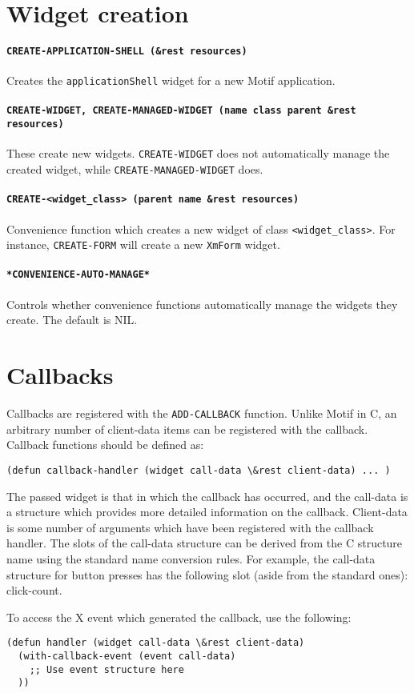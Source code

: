 \documentclass[a4paper]{article}
\newcommand{\functdescr}[1]{\paragraph{\texttt{#1}}}
\begin{document}
\section{Widget creation}


\functdescr{CREATE-APPLICATION-SHELL (\&rest resources)} Creates the
\texttt{applicationShell} widget for a new Motif application.

\functdescr{CREATE-WIDGET, CREATE-MANAGED-WIDGET (name class parent
\&rest resources)} These create new widgets.  \texttt{CREATE-WIDGET}
does not automatically manage the created widget, while
\texttt{CREATE-MANAGED-WIDGET} does.

\functdescr{CREATE-<widget\_class> (parent name \&rest resources)}
Convenience function which creates a new widget of class
\texttt{<widget\_class>}.  For instance, \texttt{CREATE-FORM} will
create a new \texttt{XmForm} widget.

\functdescr{*CONVENIENCE-AUTO-MANAGE*} Controls whether convenience
functions automatically manage the widgets they create.  The default
is NIL.

\section{Callbacks}

Callbacks are registered with the \texttt{ADD-CALLBACK} function.  Unlike Motif
in C, an arbitrary number of client-data items can be registered with
the callback.  Callback functions should be defined as:

\begin{verbatim}
(defun callback-handler (widget call-data \&rest client-data) ... )
\end{verbatim}

The passed widget is that in which the callback has occurred, and the
call-data is a structure which provides more detailed information on the
callback.  Client-data is some number of arguments which have been
registered with the callback handler.  The slots of the call-data structure
can be derived from the C structure name using the standard name conversion
rules.  For example, the call-data structure for button presses has the
following slot (aside from the standard ones): click-count.

To access the X event which generated the callback, use the following:

\begin{verbatim}
(defun handler (widget call-data \&rest client-data)
  (with-callback-event (event call-data)
    ;; Use event structure here
  ))
\end{verbatim}
\end{document}

